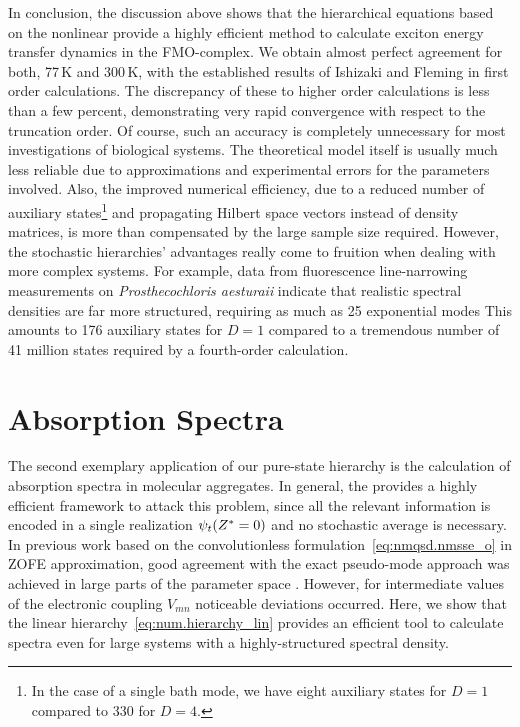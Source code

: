 


In conclusion, the discussion above shows that the hierarchical equations based on the nonlinear \NMSSE provide a highly efficient method to calculate exciton energy transfer dynamics in the FMO-complex.
We obtain almost perfect agreement for both, 77\,K and 300\,K, with the established results of Ishizaki and Fleming in first order calculations.
The discrepancy of these to higher order calculations is less than a few percent, demonstrating very rapid convergence with respect to the truncation order.
Of course, such an accuracy is completely unnecessary for most investigations of biological systems.
The theoretical model itself is usually much less reliable due to approximations and experimental errors for the parameters involved.
Also, the improved numerical efficiency, due to a reduced number of auxiliary states\footnote{%
  In the case of a single bath mode, we have eight auxiliary states for $D=1$ compared to 330 for $D=4$.
}
and propagating Hilbert space vectors instead of density matrices, is more than compensated by the large sample size required.
However, the stochastic hierarchies' advantages really come to fruition when dealing with more complex systems.
For example, data from fluorescence line-narrowing measurements on \emph{Prosthecochloris aesturaii} indicate that realistic spectral densities are far more structured, requiring as much as 25 exponential modes
This amounts to 176 auxiliary states for $D=1$ compared to a tremendous number of 41 million states required by a fourth-order calculation.

\section{Absorption Spectra}
\label{sec:app.spectra}

The second exemplary application of our pure-state hierarchy is the calculation of absorption spectra in molecular aggregates.
In general, the \NMSSE provides a highly efficient framework to attack this problem, since all the relevant information is encoded in a single realization $\psi_t({Z}^* = 0)$ and no stochastic average is necessary.
In previous work based on the convolutionless formulation~\ref{eq:nmqsd.nmsse_o} in ZOFE approximation, good agreement with the exact pseudo-mode approach was achieved in large parts of the parameter space \cite{RoStEi11_nmqsd_aggregats}.
However, for intermediate values of the electronic coupling $V_{mn}$ noticeable deviations occurred.
Here, we show that the linear hierarchy~\ref{eq:num.hierarchy_lin} provides an efficient tool to calculate spectra even for large systems with a highly-structured spectral density.

